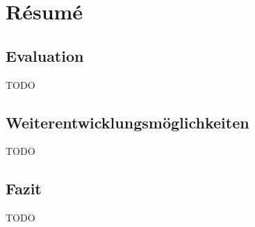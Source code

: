 \section{Résumé}
\subsection{Evaluation}
TODO

\subsection{Weiterentwicklungsmöglichkeiten}
TODO

\subsection{Fazit}
TODO
